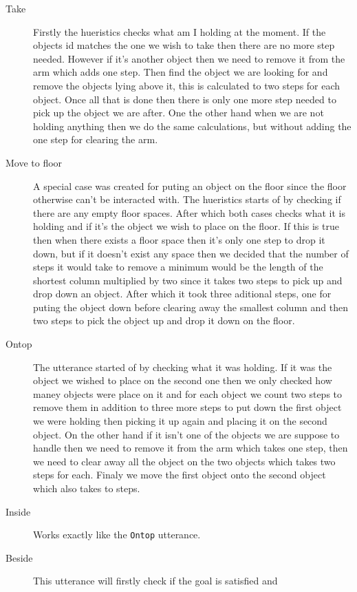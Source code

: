 \begin{description}
  \item[Take] Firstly the hueristics checks what am I holding at the moment. If
    the objects id matches the one we wish to take then there are no more step
    needed. However if it's another object then we need to remove it from the
    arm which adds one step. Then find the object we are looking for and remove
    the objects lying above it, this is calculated to two steps for each object.
    Once all that is done then there is only one more step needed to pick up the
    object we are after. One the other hand when we are not holding anything
    then we do the same calculations, but without adding the one step for
    clearing the arm.
  \item[Move to floor] A special case was created for puting an object on the
    floor since the floor otherwise can't be interacted with. The hueristics
    starts of by checking if there are any empty floor spaces. After which both
    cases checks what it is holding and if it's the object we wish to place on
    the floor. If this is true then when there exists a floor space then it's
    only one step to drop it down, but if it doesn't exist any space then we
    decided that the number of steps it would take to remove a minimum would be
    the length of the shortest column multiplied by two since it takes two steps
    to pick up and drop down an object. After which it took three aditional
    steps, one for puting the object down before clearing away the smallest
    column and then two steps to pick the object up and drop it down on the
    floor.
  \item[Ontop] The utterance started of by checking what it was holding. If it
    was the object we wished to place on the second one then we only checked how
    maney objects were place on it and for each object we count two steps to
    remove them in addition to three more steps to put down the first object we
    were holding then picking it up again and placing it on the second object.
    On the other hand if it isn't one of the objects we are suppose to handle
    then we need to remove it from the arm which takes one step, then we need to
    clear away all the object on the two objects which takes two steps for each.
    Finaly we move the first object onto the second object which also takes to
    steps.
  \item[Inside] Works exactly like the \verb|Ontop| utterance.
  \item[Beside] This utterance will firstly check if the goal is satisfied and

\end{description}
